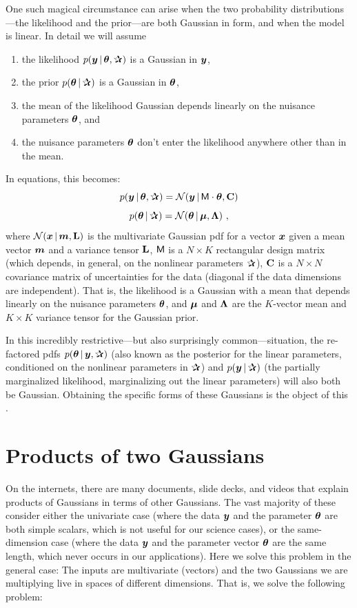 One such magical circumstance can arise when the two probability
distributions---the likelihood and the prior---are both Gaussian in
form, and when the model is linear.
In detail we will assume
\begin{enumerate}
\item
the likelihood $p(\vy\given\vtheta,\bP)$ is a Gaussian in $\boldsymbol{y}$,
\item
the prior $p(\vtheta\given\bP)$ is a Gaussian in $\boldsymbol{\theta}$,
\item
the mean of the likelihood Gaussian depends linearly on the nuisance
parameters $\boldsymbol{\theta}$, and
\item
the nuisance parameters $\boldsymbol{\theta}$ don't enter the likelihood anywhere
other than in the mean.
\end{enumerate}
In equations, this becomes:
\begin{equation}
p(\vy\given\vtheta,\bP) = \normal(\vy\given\mM\cdot\vtheta,\tC)
\end{equation}
\begin{equation}
p(\vtheta\given\bP) = \normal(\vtheta\given\vmu,\tLambda)
~ ,
\end{equation}
where
$\mathcal{N}\!\,(\boldsymbol{x}\,|\,\boldsymbol{m},\mathbf{L})$ is the multivariate Gaussian pdf for a vector $\boldsymbol{x}$
given a mean vector $\boldsymbol{m}$ and a variance tensor $\mathbf{L}$,
$\mathsf{M}$ is a $N\times K$ rectangular design matrix (which depends, in
general, on the nonlinear parameters $\bP$),
$\mathbf{C}$ is a $N\times N$ covariance matrix of uncertainties for the
data (diagonal if the data dimensions are independent).
That is, the likelihood is a Gaussian with a mean that depends
linearly on the nuisance parameters $\boldsymbol{\theta}$, and
$\boldsymbol{\mu}$ and $\mathbf{\Lambda}$ are the $K$-vector mean and $K\times K$ variance tensor
for the Gaussian prior.

In this incredibly restrictive---but also surprisingly
common---situation, the re-factored pdfs $p(\vtheta\given\vy,\bP)$
(also known as the posterior for the linear parameters, conditioned on
the nonlinear parameters in $\bP$) and $p(\vy\given\bP)$ (the
partially marginalized likelihood, marginalizing out the linear
parameters) will also both be Gaussian.
Obtaining the specific forms of these Gaussians is the object of this
\documentname.

\section{Products of two Gaussians}\label{sec:problemsolution}

On the internets, there are many documents, slide decks, and videos
that explain products of Gaussians in terms of other Gaussians.
The vast majority of these consider either the univariate case (where
the data $\boldsymbol{y}$ and the parameter $\boldsymbol{\theta}$ are both simple scalars, which
is not useful for our science cases), or the same-dimension case (where the data
$\boldsymbol{y}$ and the parameter vector $\boldsymbol{\theta}$ are the same length, which never
occurs in our applications).
Here we solve this problem in the general case:
The inputs are multivariate (vectors) and the two Gaussians we are
multiplying live in spaces of different dimensions.
That is, we solve the following problem:

